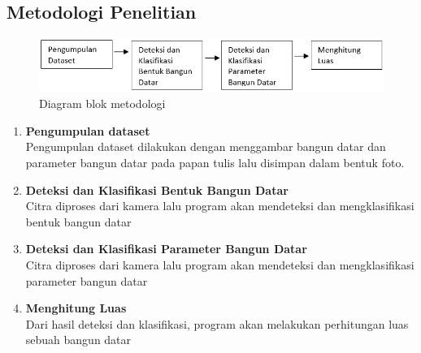 \subsection{Metodologi Penelitian}
    \begin{figure} [H] \centering
      \includegraphics[scale=0.7]{gambar/Metodologi.png}
      \caption{Diagram blok metodologi}
      \label{fig:Metodologi}
    \end{figure}

\begin{enumerate}
   \item \textbf{Pengumpulan dataset} \\
   Pengumpulan dataset dilakukan dengan menggambar bangun datar dan parameter bangun datar pada papan tulis lalu disimpan dalam bentuk foto.
   \item \textbf{Deteksi dan Klasifikasi Bentuk Bangun Datar} \\
   Citra diproses dari kamera lalu program akan mendeteksi dan mengklasifikasi bentuk bangun datar
   \item \textbf{Deteksi dan Klasifikasi Parameter Bangun Datar} \\
   Citra diproses dari kamera lalu program akan mendeteksi dan mengklasifikasi parameter bangun datar
   \item \textbf{Menghitung Luas} \\
   Dari hasil deteksi dan klasifikasi, program akan melakukan perhitungan luas sebuah bangun datar
\end{enumerate}